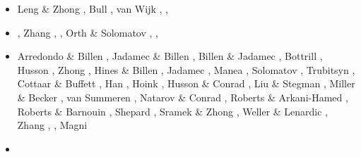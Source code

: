 \begin{itemize}
\begin{scriptsize}
\begin{itemize}
\item[\twothousandten] Leng \& Zhong \cite{lezh10}, Bull \etal \cite{bumb10}, 
                 van Wijk \etal \cite{vabv10},       \cite{baiv10}
                 \cite{bubi10}\cite{zhzl10}
                 \cite{bill10}\cite{cobe10}
                 \cite{jabi10}\cite{zhst10}
                 \cite{bofb10}\cite{hole10}
                 \cite{hazs10}\cite{fabl10}
                 \cite{dimg10}\cite{fabe10}
                 \cite{ghbz10}\cite{lamg10}
                 \cite{mcgr10}\cite{shml10}
                 \cite{spgs10a,spgs10b}, \cite{srzh10}


\item[\twothousandeleven] \cite{befa11}\cite{lemj11}
                    \cite{vaal11}\cite{legu11}
                    \cite{list11}\cite{baiv11}
                    \cite{bowg11}\cite{tree11}
                    \cite{obbh11}\cite{bics11}, 
                    Zhang \etal \cite{zhxy11}, \cite{digm11}, 
                    Orth \& Solomatov \cite{orso11}, \cite{mahg11},
                    \cite{talz11}\cite{rapy11}
                    \cite{scbb11}\cite{vasd11}
                    \cite{vacg11}\cite{zhzh11}

\item[\twothousandtwelve] Arredondo \& Billen \cite{arbi12}, Jadamec \& Billen \cite{jabi12},
                    Billen \& Jadamec \cite{bija12}, Bottrill \etal \cite{bova12},
                    Husson \etal \cite{hucf12}, Zhong \etal \cite{zhym12},
                    Hines \& Billen \cite{hibi12}, Jadamec \etal \cite{jabk12},
                    Manea \etal \cite{mapm12}, Solomatov \cite{solo12}, 
                    Trubitsyn \cite{trub12}, Cottaar \& Buffett \cite{cobu12},
                    Han \etal \cite{hats12}, Hoink \etal \cite{holr12},
                    Husson \& Conrad \cite{huco12}, Liu \& Stegman \cite{list12},
                    Miller \& Becker \cite{mibe12}, van Summeren \etal \cite{vacl12},
                    Natarov \& Conrad \cite{naco12}, Roberts \& Arkani-Hamed \cite{roar12},
                    Roberts \& Barnouin \cite{roba12}, Shepard \etal \cite{shlm12},
                    Sramek \& Zhong \cite{srzh12}, Weller \& Lenardic \cite{wele12},
                    Zhang \etal \cite{zhzf12}, \cite{zams12},
                    Magni \etal \cite{mavf12}

\item[\twothousandthirteen] \cite{bacs13}\cite{bogs13a}\cite{bogs13b}
                      \cite{jabr13}\cite{qula13}
                      \cite{oldh13}\cite{arbi13}
                      \cite{cost13}\cite{bugu13}
                      \cite{flgm13}\cite{conr13}
                      \cite{ghbh13}\cite{huyz13}
                      \cite{kecl13}\cite{vagc13}
                      \cite{mafv13}\cite{almb13}


\end{itemize}
\end{scriptsize}
\end{itemize}
